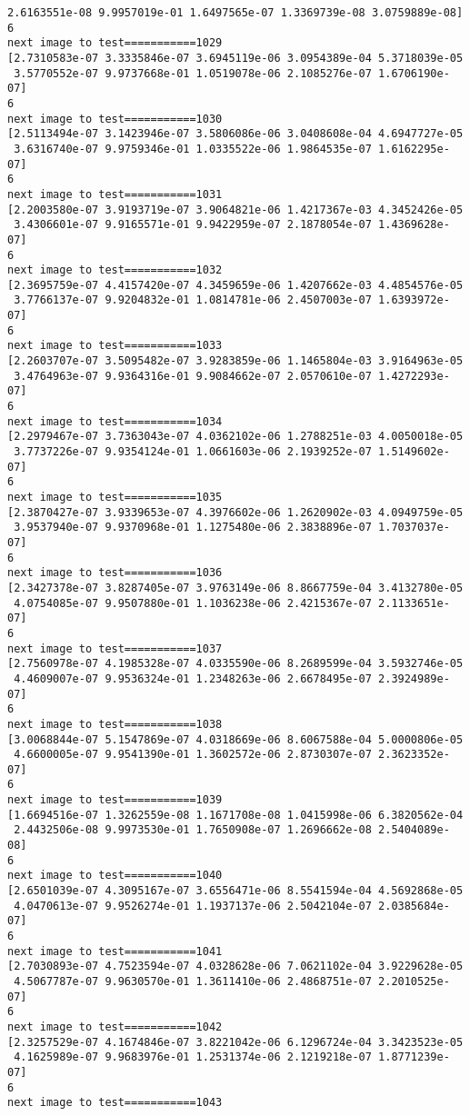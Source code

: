 \documentclass[11pt]{article}
\begin{document}
\begin{Verbatim}[commandchars=\\\{\}]
 2.6163551e-08 9.9957019e-01 1.6497565e-07 1.3369739e-08 3.0759889e-08]
6
next image to test===========1029
[2.7310583e-07 3.3335846e-07 3.6945119e-06 3.0954389e-04 5.3718039e-05
 3.5770552e-07 9.9737668e-01 1.0519078e-06 2.1085276e-07 1.6706190e-07]
6
next image to test===========1030
[2.5113494e-07 3.1423946e-07 3.5806086e-06 3.0408608e-04 4.6947727e-05
 3.6316740e-07 9.9759346e-01 1.0335522e-06 1.9864535e-07 1.6162295e-07]
6
next image to test===========1031
[2.2003580e-07 3.9193719e-07 3.9064821e-06 1.4217367e-03 4.3452426e-05
 3.4306601e-07 9.9165571e-01 9.9422959e-07 2.1878054e-07 1.4369628e-07]
6
next image to test===========1032
[2.3695759e-07 4.4157420e-07 4.3459659e-06 1.4207662e-03 4.4854576e-05
 3.7766137e-07 9.9204832e-01 1.0814781e-06 2.4507003e-07 1.6393972e-07]
6
next image to test===========1033
[2.2603707e-07 3.5095482e-07 3.9283859e-06 1.1465804e-03 3.9164963e-05
 3.4764963e-07 9.9364316e-01 9.9084662e-07 2.0570610e-07 1.4272293e-07]
6
next image to test===========1034
[2.2979467e-07 3.7363043e-07 4.0362102e-06 1.2788251e-03 4.0050018e-05
 3.7737226e-07 9.9354124e-01 1.0661603e-06 2.1939252e-07 1.5149602e-07]
6
next image to test===========1035
[2.3870427e-07 3.9339653e-07 4.3976602e-06 1.2620902e-03 4.0949759e-05
 3.9537940e-07 9.9370968e-01 1.1275480e-06 2.3838896e-07 1.7037037e-07]
6
next image to test===========1036
[2.3427378e-07 3.8287405e-07 3.9763149e-06 8.8667759e-04 3.4132780e-05
 4.0754085e-07 9.9507880e-01 1.1036238e-06 2.4215367e-07 2.1133651e-07]
6
next image to test===========1037
[2.7560978e-07 4.1985328e-07 4.0335590e-06 8.2689599e-04 3.5932746e-05
 4.4609007e-07 9.9536324e-01 1.2348263e-06 2.6678495e-07 2.3924989e-07]
6
next image to test===========1038
[3.0068844e-07 5.1547869e-07 4.0318669e-06 8.6067588e-04 5.0000806e-05
 4.6600005e-07 9.9541390e-01 1.3602572e-06 2.8730307e-07 2.3623352e-07]
6
next image to test===========1039
[1.6694516e-07 1.3262559e-08 1.1671708e-08 1.0415998e-06 6.3820562e-04
 2.4432506e-08 9.9973530e-01 1.7650908e-07 1.2696662e-08 2.5404089e-08]
6
next image to test===========1040
[2.6501039e-07 4.3095167e-07 3.6556471e-06 8.5541594e-04 4.5692868e-05
 4.0470613e-07 9.9526274e-01 1.1937137e-06 2.5042104e-07 2.0385684e-07]
6
next image to test===========1041
[2.7030893e-07 4.7523594e-07 4.0328628e-06 7.0621102e-04 3.9229628e-05
 4.5067787e-07 9.9630570e-01 1.3611410e-06 2.4868751e-07 2.2010525e-07]
6
next image to test===========1042
[2.3257529e-07 4.1674846e-07 3.8221042e-06 6.1296724e-04 3.3423523e-05
 4.1625989e-07 9.9683976e-01 1.2531374e-06 2.1219218e-07 1.8771239e-07]
6
next image to test===========1043

\end{Verbatim}
\end{document}
